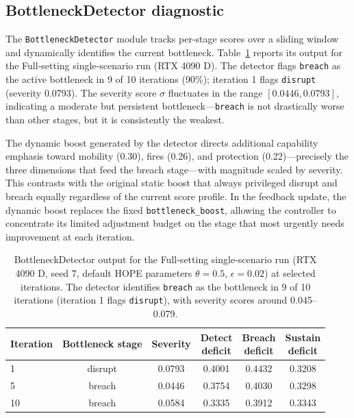 \subsection{BottleneckDetector diagnostic}

The \texttt{BottleneckDetector} module tracks per-stage scores over a sliding window and dynamically identifies the current bottleneck. Table~\ref{tab:bottleneck-diagnostic} reports its output for the Full-setting single-scenario run (RTX 4090 D). The detector flags \texttt{breach} as the active bottleneck in 9 of 10 iterations (90\%); iteration 1 flags \texttt{disrupt} (severity 0.0793). The severity score $\sigma$ fluctuates in the range $[0.0446, 0.0793]$, indicating a moderate but persistent bottleneck---\texttt{breach} is not drastically worse than other stages, but it is consistently the weakest.

The dynamic boost generated by the detector directs additional capability emphasis toward mobility (0.30), fires (0.26), and protection (0.22)---precisely the three dimensions that feed the breach stage---with magnitude scaled by severity. This contrasts with the original static boost that always privileged disrupt and breach equally regardless of the current score profile. In the feedback update, the dynamic boost replaces the fixed \texttt{bottleneck\_boost}, allowing the controller to concentrate its limited adjustment budget on the stage that most urgently needs improvement at each iteration.

\begin{table}[ht]
\centering
\caption{BottleneckDetector output for the Full-setting single-scenario run (RTX 4090 D, seed 7, default HOPE parameters $\theta=0.5$, $\epsilon=0.02$) at selected iterations. The detector identifies \texttt{breach} as the bottleneck in 9 of 10 iterations (iteration 1 flags \texttt{disrupt}), with severity scores around 0.045--0.079.}
\label{tab:bottleneck-diagnostic}
\small
\setlength{\tabcolsep}{5pt}
\begin{tabular}{lccccc}
\toprule
Iteration & Bottleneck stage & Severity & \shortstack{Detect\\deficit} & \shortstack{Breach\\deficit} & \shortstack{Sustain\\deficit} \\
\midrule
1 & disrupt & 0.0793 & 0.4001 & 0.4432 & 0.3208 \\
5 & breach & 0.0446 & 0.3754 & 0.4030 & 0.3298 \\
10 & breach & 0.0584 & 0.3335 & 0.3912 & 0.3343 \\
\bottomrule
\end{tabular}
\end{table}

